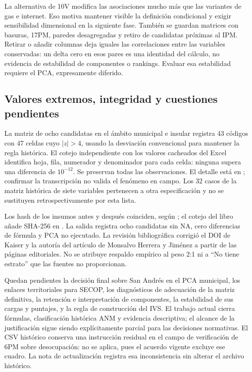 La alternativa de 10V modifica las asociaciones mucho más que las variantes de gas e internet. Eso motiva mantener visible la definición condicional y exigir sensibilidad dimensional en la siguiente fase. También se guardan matrices con basuras, 17PM, paredes desagregadas y retiro de candidatas próximas al IPM. Retirar o añadir columnas deja iguales las correlaciones entre las variables conservadas: un delta cero en esos pares es una identidad del cálculo, no evidencia de estabilidad de componentes o rankings. Evaluar esa estabilidad requiere el PCA, expresamente diferido.

\subsection{Valores extremos, integridad y cuestiones pendientes}

La matriz de ocho candidatas en el ámbito municipal e insular registra 43 códigos con 47 celdas cuyo $|z|>4$, usando la desviación convencional para mantener la regla histórica. El cotejo independiente con los valores cacheados del Excel identifica hoja, fila, numerador y denominador para cada celda: ninguna supera una diferencia de $10^{-12}$. Se preservan todas las observaciones. El detalle está en ; confirmar la transcripción no valida el fenómeno en campo. Los 32 casos de la matriz histórica de siete variables pertenecen a otra especificación y no se sustituyen retrospectivamente por esta lista.

Los hash de los insumos antes y después coinciden, según ; el cotejo del libro añade SHA-256 en . La salida  registra ocho candidatas sin NA, cero diferencias de fórmula y PCA no ejecutado. La revisión bibliográfica corrigió el DOI de Kaiser y la autoría del artículo de Monsalvo Herrera y Jiménez a partir de las páginas editoriales. No se atribuye respaldo empírico al peso 2:1 ni a \enquote{No tiene estrato} que las fuentes no proporcionan.

Quedan pendientes la decisión final sobre San Andrés en el PCA municipal, los enlaces territoriales para SECOP, los diagnósticos de adecuación de la matriz definitiva, la retención e interpretación de componentes, la estabilidad de sus cargas y puntajes, y la regla de construcción del IVS. El trabajo actual cierra fórmulas, clasificación histórica ANM y evidencia descriptiva; el alcance de la justificación sigue siendo explícitamente parcial para las decisiones normativas. El CSV histórico conserva una instrucción residual en el campo de verificación de 6PM sobre desocupación: no se aplica, pues el acuerdo vigente excluye ese cuadro. La nota de actualización registra esa inconsistencia sin alterar el archivo histórico.
